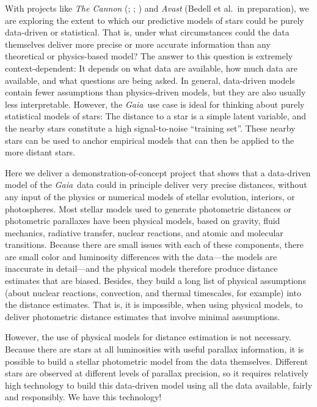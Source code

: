 \documentclass[modern]{aastex61}
\newcommand{\project}[1]{\textsl{#1}}
\newcommand{\gaia}{\project{Gaia}}
\begin{document}
With projects like \project{The Cannon} (\citealt{ness15}; \citealt{casey17}; \citealt{ho17})
and \project{Avast} (Bedell et al.\ in preparation),
we are exploring the extent to which our predictive models of
stars could be purely data-driven or statistical.
That is, under what circumstances could the data themselves deliver
more precise or more accurate information than any theoretical or
physics-based model?
The answer to this question is extremely context-dependent: It depends
on what data are available, how much data are available, and what
questions are being asked.
In general, data-driven models contain fewer assumptions than
physics-driven models, but they are also usually less interpretable.
However, the \gaia\ use case is ideal for thinking about purely statistical
models of stars:
The distance to a star is a simple latent variable, and the nearby
stars constitute a high signal-to-noise ``training set''.
These nearby stars can be used to anchor empirical models that can
then be applied to the more distant stars.

Here we deliver a demonstration-of-concept project that shows that a
data-driven model of the \gaia\ data could in principle deliver very
precise distances, without any input of the physics or numerical models of stellar
evolution, interiors, or photospheres.
Most stellar models used to generate photometric distances or photometric
parallaxes have been physical models, based on gravity, fluid mechanics,
radiative transfer, nuclear reactions, and atomic and molecular transitions.
Because there are small issues with each of these components, there are small
color and luminosity differences with the data---the models are inaccurate in detail---and
the physical models therefore produce distance estimates that are biased.
Besides, they build a long list of physical assumptions (about
nuclear reactions, convection, and thermal timescales, for example)
into the distance estimates.
That is, it is impossible, when using physical models,
to deliver photometric distance estimates that involve minimal assumptions.

However, the use of physical models for distance estimation is not necessary.
Because there are stars at all luminosities with useful parallax information,
it is possible to build a stellar photometric model from the data themselves.
Different stars are observed at different levels of parallax precision,
so it requires relatively high technology to build this data-driven model
using all the data available, fairly and responsibly.
We have this technology!
\end{document}
